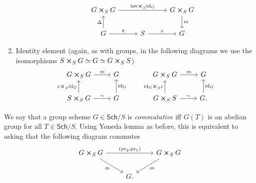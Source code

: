 \begin{rem}[]
\begin{enumerate}
\begin{equation*}
			\qquad
			\begin{tikzcd}[column sep=2.7em]
				G \cross_{ S } G
				\arrow[rr, "\mathrm{inv} \cross_S \mathrm{id}_{ G }", rightarrow] & &
				G \cross_{ S } G \arrow[d, "m", rightarrow] \\
				G \arrow[u, "\Delta", rightarrow] 
				\arrow[r, "\pi", rightarrow] &
				S \arrow[r, "\varepsilon", rightarrow] & 
				G
			\end{tikzcd}
			\end{equation*} 
		\item Identity element (again, as with groups, in the following diagrams
			we use the isomorphisms
			$S \cross_{ S } G \simeq G \simeq G \cross_{ S } S$)
			\begin{equation*}
			\begin{tikzcd}
				G \cross_{ S } G \arrow[r, "m", rightarrow] &
				G \\
				S \cross_{ S } G \arrow[r, "\sim", rightarrow] 
				\arrow[u, "\varepsilon \cross_S \mathrm{id}_{ G }", rightarrow] &
				G \arrow[u, "\mathrm{id}_{ G }"', rightarrow] 
			\end{tikzcd}
			\qquad
			\begin{tikzcd}
				G \cross_{ S } G \arrow[r, "m", rightarrow] &
				G \\
				G \cross_{ S } S \arrow[r, "\sim", rightarrow] 
				\arrow[u, "\mathrm{id}_{ G } \cross_S \varepsilon", rightarrow] &
				G. \arrow[u, "\mathrm{id}_{ G }"', rightarrow] 
			\end{tikzcd}
			\end{equation*} 
	\end{enumerate}
\end{rem}


\begin{defn}
	We say that a group scheme $G \in \mathsf{Sch}/S$ is {\em commutative}
	iff $G(T)$ is an abelian group for all $T \in \mathsf{Sch}/S$.
	Using Yoneda lemma as before,
	this is equivalent to asking that the following diagram commutes
	\begin{equation*}
	\begin{tikzcd}
		G \cross_S G \arrow[rr, "{ \left(\mathrm{pr}_2, \mathrm{pr}_1\right)}", rightarrow] 
		\arrow[rd, "m"', rightarrow] & &
		G \cross_{ S } G
		\arrow[ld, "m", rightarrow] \\
					     &
		G
	.\end{tikzcd}
	\end{equation*}
\end{defn}


